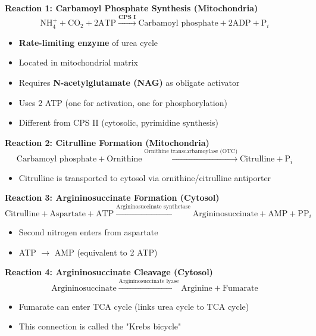 \textbf{Reaction 1: Carbamoyl Phosphate Synthesis (Mitochondria)}
\[
\text{NH}_4^+ + \text{CO}_2 + 2\text{ATP} \xrightarrow{\textbf{CPS I}} \text{Carbamoyl phosphate} + 2\text{ADP} + \text{P}_i
\]

\begin{tcolorbox}[colback=yellow!10, colframe=yellow!70!black, title=\textbf{Carbamoyl Phosphate Synthetase I (CPS I)}]
\begin{itemize}
    \item \textbf{Rate-limiting enzyme} of urea cycle
    \item Located in mitochondrial matrix
    \item Requires \textbf{N-acetylglutamate (NAG)} as obligate activator
    \item Uses 2 ATP (one for activation, one for phosphorylation)
    \item Different from CPS II (cytosolic, pyrimidine synthesis)
\end{itemize}
\end{tcolorbox}

\textbf{Reaction 2: Citrulline Formation (Mitochondria)}
\[
\text{Carbamoyl phosphate} + \text{Ornithine} \xrightarrow{\text{Ornithine transcarbamoylase (OTC)}} \text{Citrulline} + \text{P}_i
\]
\begin{itemize}
    \item Citrulline is transported to cytosol via ornithine/citrulline antiporter
\end{itemize}

\textbf{Reaction 3: Argininosuccinate Formation (Cytosol)}
\[
\text{Citrulline} + \text{Aspartate} + \text{ATP} \xrightarrow{\text{Argininosuccinate synthetase}} \text{Argininosuccinate} + \text{AMP} + \text{PP}_i
\]
\begin{itemize}
    \item Second nitrogen enters from aspartate
    \item ATP $\rightarrow$ AMP (equivalent to 2 ATP)
\end{itemize}

\textbf{Reaction 4: Argininosuccinate Cleavage (Cytosol)}
\[
\text{Argininosuccinate} \xrightarrow{\text{Argininosuccinate lyase}} \text{Arginine} + \text{Fumarate}
\]
\begin{itemize}
    \item Fumarate can enter TCA cycle (links urea cycle to TCA cycle)
    \item This connection is called the "Krebs bicycle"
\end{itemize}

